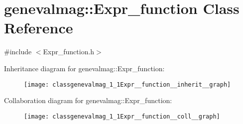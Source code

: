 \hypertarget{classgenevalmag_1_1Expr__function}{
\section{genevalmag::Expr\_\-function Class Reference}
\label{classgenevalmag_1_1Expr__function}
}


{\ttfamily \#include $<$Expr\_\-function.h$>$}



Inheritance diagram for genevalmag::Expr\_\-function:\nopagebreak
\begin{figure}[H]
\begin{center}
\leavevmode
\texttt{[image: classgenevalmag\_1\_1Expr\_\_function\_\_inherit\_\_graph]}
\end{center}
\end{figure}


Collaboration diagram for genevalmag::Expr\_\-function:\nopagebreak
\begin{figure}[H]
\begin{center}
\leavevmode
\texttt{[image: classgenevalmag\_1\_1Expr\_\_function\_\_coll\_\_graph]}
\end{center}
\end{figure}

